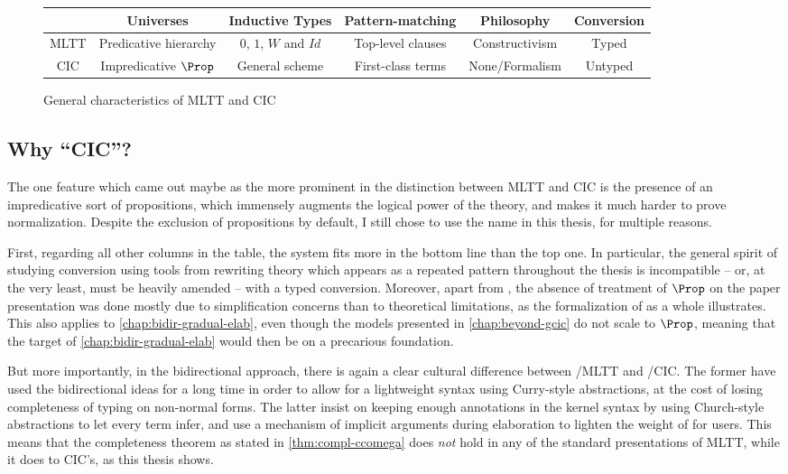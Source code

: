 \begin{figure*}[h]
  \begin{tabular}{cccccc}
    \rule{0pt}{4ex} & Universes & Inductive Types & Pattern-matching & Philosophy & Conversion \\
    \midrule
    MLTT \rule{0pt}{4ex} & Predicative hierarchy & $0$, $1$, $W$ and $Id$ & Top-level clauses & Constructivism & Typed \\
    CIC \rule{0pt}{4ex} & Impredicative $\Prop$ & General scheme & First-class terms & None/Formalism & Untyped
  \end{tabular}
  \caption{General characteristics of MLTT and CIC}\label{fig:mltt-cic}
\end{figure*}

\subsection*{Why “CIC”?}

The one feature which came out maybe as the more prominent in the distinction between MLTT and
CIC is the presence of an impredicative sort of propositions, which immensely augments the
logical power of the theory, and makes it much harder to prove normalization.
Despite the exclusion of propositions by default, I still chose to use the name 
in this thesis, for multiple reasons.

First, regarding all other columns in the table, the system fits more
in the bottom line than the top one. In particular, the general spirit of studying
conversion using tools from rewriting theory which appears as a repeated pattern throughout
the thesis is incompatible – or, at the very least, must be heavily amended –
with a typed conversion.
Moreover, apart from , the absence of
treatment of $\Prop$ on the paper presentation was done mostly due to simplification concerns
than to theoretical limitations, as the formalization of  as a whole illustrates.
This also applies to \cref{chap:bidir-gradual-elab}, even though the models presented
in \cref{chap:beyond-gcic} do not scale to $\Prop$, meaning that the target
of \cref{chap:bidir-gradual-elab} would then be on a precarious foundation.

But more importantly, in the bidirectional approach,
there is again a clear cultural difference between
/MLTT and /CIC\@. The former have used the bidirectional ideas for a long
time in order to allow for a lightweight syntax using Curry-style abstractions,
at the cost of losing completeness of typing on non-normal forms.%
%
The latter insist on keeping enough annotations in the kernel syntax by using Church-style
abstractions to let every term infer,
and use a mechanism of implicit arguments during elaboration to lighten the weight of for users.
This means that the completeness theorem as stated in \cref{thm:compl-ccomega}
does \emph{not} hold in any of the standard presentations of MLTT,
while it does to CIC’s, as this thesis shows.


